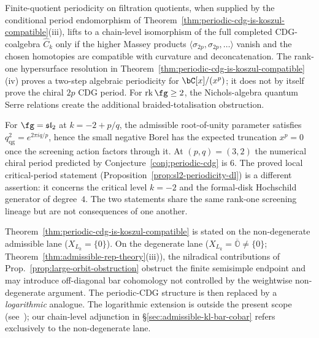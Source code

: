 \begin{remark}
\label{rem:massey-vanishing-periodic-cdg}
%
Finite-quotient periodicity on filtration quotients, when supplied
by the conditional period endomorphism of
Theorem~\ref{thm:periodic-cdg-is-koszul-compatible}(iii), lifts to a
chain-level isomorphism of the full completed CDG-coalgebra
$\widehat C_k$ only if the higher Massey products
$\langle\sigma_{2p}, \sigma_{2p}, \ldots \rangle$ vanish and the
chosen homotopies are compatible with curvature and
deconcatenation.  The rank-one hypersurface resolution in
Theorem~\ref{thm:periodic-cdg-is-koszul-compatible}(iv) proves a
two-step algebraic periodicity for $\bC[x]/(x^p)$; it does not by
itself prove the chiral $2p$ CDG period.  For
$\mathrm{rk}\,\fg\geq2$, the Nichols-algebra quantum Serre relations
create the additional braided-totalisation obstruction.
\end{remark}

\begin{remark}
\label{rem:periodic-cdg-sl2-cross-check}
For $\fg = \mathfrak{sl}_2$ at $k=-2+p/q$, the admissible
root-of-unity parameter satisfies
$q_{\mathrm{qg}}^2=e^{2\pi i q/p}$, hence the small negative Borel
has the expected truncation $x^p=0$ once the screening action factors
through it.  At $(p,q)=(3,2)$ the numerical chiral period predicted by
Conjecture~\ref{conj:periodic-cdg} is $6$.  The proved local
critical-period statement
\textup{(}Proposition~\ref{prop:sl2-periodicity-dl}\textup{)} is a
different assertion: it concerns the critical level $k=-2$ and the
formal-disk Hochschild generator of degree~$4$.  The two statements
share the same rank-one screening lineage but are not consequences of
one another.
\end{remark}

\begin{remark}
\label{rem:degenerate-admissible-scope}
Theorem~\ref{thm:periodic-cdg-is-koszul-compatible} is stated
on the non-degenerate admissible lane ($X_{L_k} = \{0\}$). On
the degenerate lane ($X_{L_k} = \overline{\mathbb{O}} \neq \{0\}$;
Theorem~\ref{thm:admissible-rep-theory}(iii)), the nilradical
contributions of Prop.~\ref{prop:large-orbit-obstruction} obstruct
the finite semisimple endpoint and may introduce off-diagonal bar
cohomology not controlled by the weightwise non-degenerate argument.
The periodic-CDG structure is then replaced by a \emph{logarithmic}
analogue. The logarithmic extension is outside the present scope
\textup{(}see~\cite{CKL20}\textup{)}; our chain-level adjunction
in \S\ref{sec:admissible-kl-bar-cobar} refers exclusively to the
non-degenerate lane.
\end{remark}

